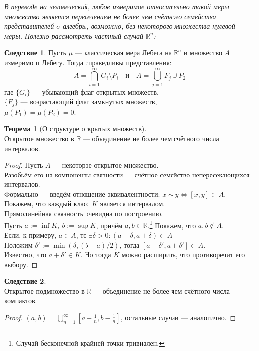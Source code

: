 \documentclass[11pt,a4paper]{report}
\def\Real{\mathbb{R}}
\theoremstyle{definition}
\theoremstyle{definition}
\newtheorem{theorem}{Теорема}[section]
\newtheorem{corollary}{Следствие}[section]
\theoremstyle{definition}
\begin{document}
	\textit{В переводе на человеческий, любое измеримое относительно такой меры множество является пересечением не более чем счётного семейства представителей $ \sigma $-алгебры, возможно, без некоторого множества нулевой меры. Полезно рассмотреть частный случай $ \Real^{n} $:}
	\begin{corollary}
		Пусть $ \mu $ — классическая мера Лебега на $ \Real^{n} $ и множество $ A $ измеримо п Лебегу. Тогда справедливы представления:
		\[
			A = \bigcap\limits_{i=1}^{\infty}{G_{i}\setminus P_{i}}\quad \mbox{и} \quad A = \bigcup\limits_{j=1}^{\infty}{F_{j} \cup P_{2}}
		\]
		где $ \{G_{i}\} $ — убывающий флаг открытых множеств,\\ 
		$ \{F_{j}\} $ — возрастающий флаг замкнутых множеств,\\
		 $ \mu(P_{1}) = \mu(P_{2}) = 0 $. 
	\end{corollary}
	\begin{theorem}[О структуре открытых множеств]$  $\\
		Открытое множество в $ \Real $ — объединение не более чем счётного числа интервалов.
	\end{theorem}
	\begin{proof}
		Пусть $ A $ ­— некоторое открытое множество.\\
		Разобьём его на компоненты связности — счётное семейство непересекающихся интервалов.\\
		Формально — введём отношение эквивалентности: $ x \sim y \iff [x, y] \subset A $.\\
		Покажем, что каждый класс $ K $ является интервалом.\\
		Прямолинейная связность очевидна по построению.\\
		Пусть $ a := \inf K,\ b := \sup K $, причём $ a, b \in \Real $.\footnote{Случай бесконечной крайней точки тривиален.} Покажем, что $ a, b \not \in A $.\\
		Если, к примеру, $ a \in A $, то $ \exists \delta > 0: (a - \delta, a + \delta) \subset A $.\\ 
		Положим $ \delta' := \min(\delta, (b - a)/2) $, тогда $ [a - \delta', a + \delta'] \subset A $.\\
		Известно, что $ a + \delta' \in K $. Но тогда $ K $ можно расширить, что противоречит его выбору.
	\end{proof}
	\begin{corollary}$  $\\
		Открытое подмножество в $ \Real $ — объединение не более чем счётного числа компактов.
	\end{corollary}
	\begin{proof}
		$ (a, b) = \bigcup\limits_{n=1}^{\infty}{ [a + \frac{1}{n}, b - \frac{1}{n}] } $, остальные случаи — аналогично.
	\end{proof}
\end{document}
